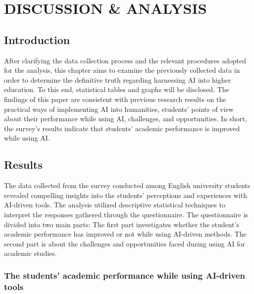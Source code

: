 \chapter{DISCUSSION \& ANALYSIS}
\section{Introduction}
After clarifying the data collection process and the relevant procedures
adopted for the analysis, this chapter aims to examine the previously
collected data in order to determine the definitive truth regarding
harnessing AI into higher education. To this end, statistical tables
and graphs will be disclosed. The findings of this paper are consistent
with previous research results on the practical ways of implementing AI
into humanities, students' points of view about their performance while
using AI, challenges, and opportunities. In short, the survey's results
indicate that students' academic performance is improved while using AI.
\section{Results}
The data collected from the survey conducted among English university
students revealed compelling insights into the students' perceptions
and experiences with AI-driven tools. The analysis utilized descriptive
statistical techniques to interpret the responses gathered through
the questionnaire. The questionnaire is divided into two main parts:
The first part investigates whether the student's academic performance
has improved or not while using AI-driven methods. The second part is
about the challenges and opportunities faced during using AI for academic studies.
\subsection{The students' academic performance while using AI-driven tools}

\begin{figure}[h]
	\centering
\end{figure}

